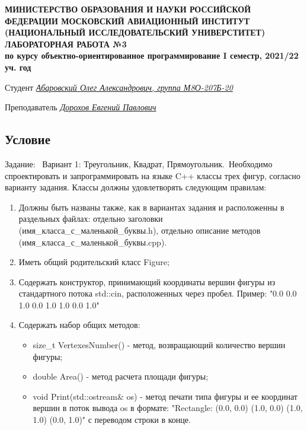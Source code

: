 \documentclass[12pt]{article}
\begin{document}
\begin{titlepage}
\begin{center}
\textbf{МИНИСТЕРСТВО ОБРАЗОВАНИЯ И НАУКИ РОССИЙСКОЙ ФЕДЕРАЦИИ
\medskip
МОСКОВСКИЙ АВИАЦИОННЫЙ ИНСТИТУТ
(НАЦИОНАЛЬНЫЙ ИССЛЕДОВАТЕЛЬСКИЙ УНИВЕРСТИТЕТ)
\vfill\vfill
{\Huge ЛАБОРАТОРНАЯ РАБОТА №3} \\
по курсу объектно-ориентированное программирование
I семестр, 2021/22 уч. год}
\end{center}
\vfill

Студент \uline{\it {Абаровский Олег Александрович, группа М8О-207Б-20}\hfill}

Преподаватель \uline{\it {Дорохов Евгений Павлович}\hfill}

\vfill
\end{titlepage}

\subsection*{Условие}

Задание: \
Вариант 1: Треугольник, Квадрат, Прямоугольник.\
Необходимо спроектировать и запрограммировать на языке C++ классы трех фигур, согласно варианту задания. Классы должны удовлетворять следующим правилам:
\begin{enumerate}
\item Должны быть названы также, как в вариантах задания и расположенны в раздельных файлах: отдельно заголовки (имя\_класса\_с\_маленькой\_буквы.h), отдельно описание методов (имя\_класса\_с\_маленькой\_буквы.cpp).
\item Иметь общий родительский класс Figure;
\item Содержать конструктор, принимающий координаты вершин фигуры из стандартного потока std::cin, расположенных через пробел. Пример: "0.0 0.0 1.0 0.0 1.0 1.0 0.0 1.0"
\item Содержать набор общих методов:
\begin{itemize}
    \item size\_t VertexesNumber() - метод, возвращающий количество вершин фигуры;
    \item double Area() - метод расчета площади фигуры;
    \item void Print(std::ostream& os) - метод печати типа фигуры и ее координат вершин в поток вывода os в формате: "Rectangle: (0.0, 0.0) (1.0, 0.0) (1.0, 1.0) (0.0, 1.0)" с переводом строки в конце.
\end{itemize}
\end{enumerate}
\end{document}
